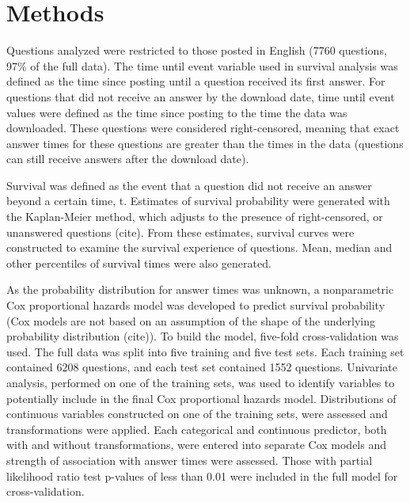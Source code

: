 \documentclass{article}
\begin{document}
\section*{Methods}

Questions analyzed were restricted to those posted in English (7760 questions, 97\% of the full data). The time until event variable used in survival analysis was defined as the time since posting until a question received its first answer. For questions that did not receive an answer by the download date, time until event values were defined as the time since posting to the time the data was downloaded. These questions were considered right-censored, meaning that exact answer times for these questions are greater than the times in the data (questions can still receive answers after the download date). 

Survival was defined as the event that a question did not receive an answer beyond a certain time, t. Estimates of survival probability were generated with the Kaplan-Meier method, which adjusts to the presence of right-censored, or unanswered questions (cite). From these estimates, survival curves were constructed to examine the survival experience of questions. Mean, median and other percentiles of survival times were also generated. 

As the probability distribution for answer times was unknown, a nonparametric Cox proportional hazards model was developed to predict survival probability (Cox models are not based on an assumption of the shape of the underlying probability distribution (cite)). To build the model, five-fold cross-validation was used. The full data was split into five training and five test sets. Each training set contained 6208 questions, and each test set contained 1552 questions. Univariate analysis, performed on one of the training sets, was used to identify variables to potentially include in the final Cox proportional hazards model. Distributions of continuous variables constructed on one of the training sets, were assessed and transformations were applied. Each categorical and continuous predictor, both with and without transformations, were entered into separate Cox models and strength of association with answer times were assessed. Those with partial likelihood ratio test p-values of less than 0.01 were included in the full model for cross-validation.
\end{document}
